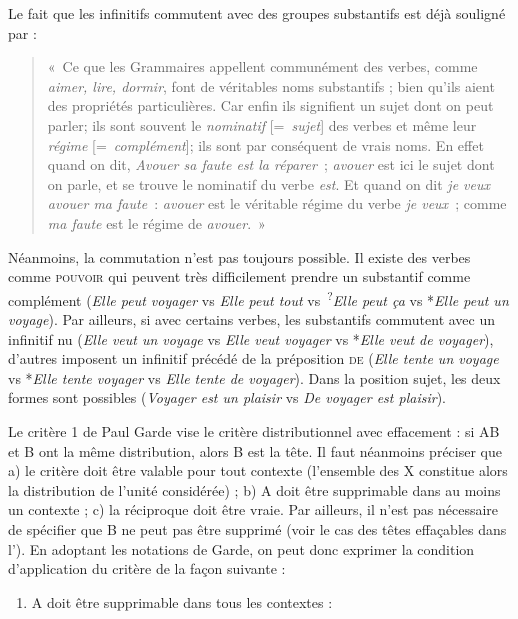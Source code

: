 {     Le fait que les infinitifs commutent avec des groupes substantifs est déjà souligné par \citet[59]{buffier1709grammaire} : 
    \begin{quote}
        «~Ce que les Grammaires appellent communément des verbes, comme \textit{aimer, lire, dormir}, font de véritables noms substantifs ; bien qu’ils aient des propriétés particulières. Car enfin ils signifient un sujet dont on peut parler; ils sont souvent le \textit{nominatif} [=~\textit{sujet}] des verbes et même leur \textit{régime} [=~\textit{complément}]; ils sont par conséquent de vrais noms. En effet quand on dit, \textit{Avouer sa faute est la réparer~}; \textit{avouer} est ici le sujet dont on parle, et se trouve le nominatif du verbe \textit{est}. Et quand on dit \textit{je veux avouer ma faute~}: \textit{avouer} est le véritable régime du verbe \textit{je veux~}; comme \textit{ma faute} est le régime de \textit{avouer}.~»
    \end{quote}

    Néanmoins, la commutation n’est pas toujours possible. Il existe des verbes comme \textsc{pouvoir} qui peuvent très difficilement prendre un substantif comme complément (\textit{Elle peut voyager} vs \textit{Elle peut tout} vs~\textsuperscript{?}\textit{Elle peut ça} vs *\textit{Elle peut un voyage}). Par ailleurs, si avec certains verbes, les substantifs commutent avec un infinitif nu (\textit{Elle veut un voyage} vs \textit{Elle veut voyager} vs *\textit{Elle veut de voyager}), d’autres imposent un infinitif précédé de la préposition \textsc{de} (\textit{Elle tente un voyage} vs *\textit{Elle tente voyager} vs \textit{Elle tente de voyager}). Dans la position sujet, les deux formes sont possibles (\textit{Voyager est un plaisir} vs \textit{De voyager est plaisir}).

     Le critère 1 de Paul Garde vise le critère distributionnel avec effacement : si AB et B ont la même distribution, alors B est la tête.
    Il faut néanmoins préciser que a)  le critère doit être valable pour tout contexte (l’ensemble des X constitue alors la distribution de l’unité considérée) ; b)  A doit être supprimable dans au moins un contexte ; c)  la réciproque doit être vraie. Par ailleurs, il n’est pas nécessaire de spécifier que B ne peut pas être supprimé (voir le cas des têtes effaçables dans l’). En adoptant les notations de Garde, on peut donc exprimer la condition d'application du critère de la façon suivante :
    \begin{enumerate}[label=1\alph*.]
    \item A doit être supprimable dans tous les contextes :


\end{enumerate}}
